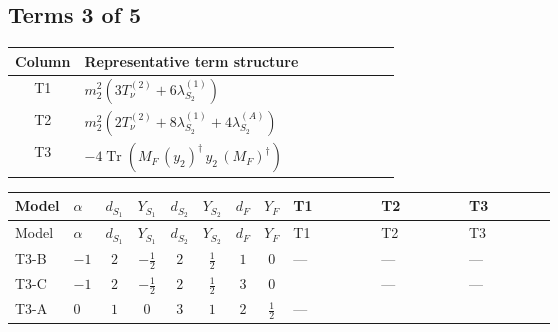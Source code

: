 \documentclass[8pt]{article}
\begin{document}
\begin{landscape}
\subsection*{Terms 3 of 5}
\begin{center}
\begin{tabular}{@{}c >{\raggedright\arraybackslash}p{0.82\linewidth}@{}}
\toprule
Column & Representative term structure \\
\midrule
T1 & \(\displaystyle {m_2^2} (3 T_{\nu}^{(2)}+6 {\lambda_{S_2}^{(1)}})\) \\
\midrule
T2 & \(\displaystyle {m_2^2} (2 T_{\nu}^{(2)}+8 {\lambda_{S_2}^{(1)}}+4 {\lambda_{S_2}^{(A)}})\) \\
\midrule
T3 & \(\displaystyle -4 \operatorname{Tr}\!\left({M_F}\,\left({y_2}\right)^{\dagger}\,{y_2}\,\left({M_F}\right)^{\dagger}\right)\) \\
\midrule
\bottomrule
\end{tabular}
\end{center}
\smallskip
\tiny
\begin{longtable}{@{}llcccccc >{\raggedright\arraybackslash}p{0.21\linewidth} >{\raggedright\arraybackslash}p{0.21\linewidth} >{\raggedright\arraybackslash}p{0.21\linewidth}@{}}
\toprule
Model & $\alpha$ & $d_{S_1}$ & $Y_{S_1}$ & $d_{S_2}$ & $Y_{S_2}$ & $d_F$ & $Y_F$ & T1 & T2 & T3 \\
\midrule
\endfirsthead
\toprule
Model & $\alpha$ & $d_{S_1}$ & $Y_{S_1}$ & $d_{S_2}$ & $Y_{S_2}$ & $d_F$ & $Y_F$ & T1 & T2 & T3 \\
\midrule
\endhead
T3-B & $-1$ & $2$ & $-\frac{1}{2}$ & $2$ & $\frac{1}{2}$ & $1$ & $0$ & --- & --- & --- \\
\midrule
T3-C & $-1$ & $2$ & $-\frac{1}{2}$ & $2$ & $\frac{1}{2}$ & $3$ & $0$ & \scriptsize\adjustbox{max width=\linewidth}{$\begin{gathered} {m_2^2} (3 T_{\nu}^{(2)}+6 {\lambda_{S_2}^{(1)}})\end{gathered}$} & --- & --- \\
\midrule
T3-A & $0$ & $1$ & $0$ & $3$ & $1$ & $2$ & $\frac{1}{2}$ & --- & \scriptsize\adjustbox{max width=\linewidth}{$\begin{gathered} {m_2^2} (2 T_{\nu}^{(2)}+8 {\lambda_{S_2}^{(1)}}+4 {\lambda_{S_2}^{(A)}})\end{gathered}$} & \scriptsize\adjustbox{max width=\linewidth}{$\begin{gathered} -4 \operatorname{Tr}\!\left({M_F}\,\left({y_2}\right)^{\dagger}\,{y_2}\,\left({M_F}\right)^{\dagger}\right)\end{gathered}$} \\

\end{longtable}
\end{landscape}
\end{document}
